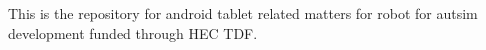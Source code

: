 This is the repository for android tablet related matters for robot for autsim development funded through H\+EC T\+DF. 